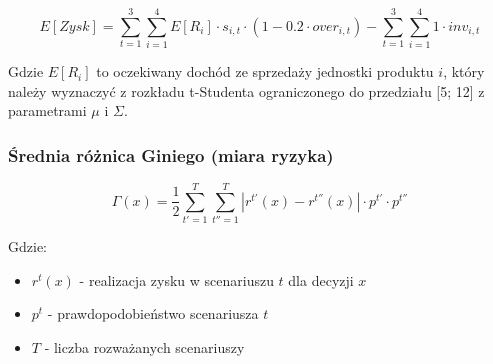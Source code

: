 \begin{equation}
E[Zysk] = \sum_{t=1}^{3} \sum_{i=1}^{4} E[R_i] \cdot s_{i,t} \cdot (1 - 0.2 \cdot over_{i,t}) - \sum_{t=1}^{3} \sum_{i=1}^{4} 1 \cdot inv_{i,t}
\end{equation}

Gdzie $E[R_i]$ to oczekiwany dochód ze sprzedaży jednostki produktu $i$, który należy wyznaczyć z rozkładu t-Studenta ograniczonego do przedziału [5; 12] z parametrami $\mu$ i $\Sigma$.

\subsubsection{Średnia różnica Giniego (miara ryzyka)}

\begin{equation}
\Gamma(x) = \frac{1}{2} \sum_{t'=1}^{T} \sum_{t''=1}^{T} |r^{t'}(x) - r^{t''}(x)| \cdot p^{t'} \cdot p^{t''}
\end{equation}

Gdzie:
\begin{itemize}
  \item $r^t(x)$ - realizacja zysku w scenariuszu $t$ dla decyzji $x$
  \item $p^t$ - prawdopodobieństwo scenariusza $t$
  \item $T$ - liczba rozważanych scenariuszy
\end{itemize}

